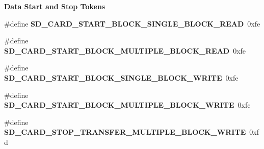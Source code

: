 \begin{Indent}\textbf{ Data Start and Stop Tokens}\par
\begin{DoxyCompactItemize}
\item 
\mbox{\label{spi-sd-card_8c_ab226576a16ca8168a108db3cf12d5122}} 
\#define {\bfseries S\+D\+\_\+\+C\+A\+R\+D\+\_\+\+S\+T\+A\+R\+T\+\_\+\+B\+L\+O\+C\+K\+\_\+\+S\+I\+N\+G\+L\+E\+\_\+\+B\+L\+O\+C\+K\+\_\+\+R\+E\+AD}~0xfe
\item 
\mbox{\label{spi-sd-card_8c_afbf6521b707e3dbce8de0b66d4e6a5ec}} 
\#define {\bfseries S\+D\+\_\+\+C\+A\+R\+D\+\_\+\+S\+T\+A\+R\+T\+\_\+\+B\+L\+O\+C\+K\+\_\+\+M\+U\+L\+T\+I\+P\+L\+E\+\_\+\+B\+L\+O\+C\+K\+\_\+\+R\+E\+AD}~0xfe
\item 
\mbox{\label{spi-sd-card_8c_ad01809d8d257598e3c58e661626df28f}} 
\#define {\bfseries S\+D\+\_\+\+C\+A\+R\+D\+\_\+\+S\+T\+A\+R\+T\+\_\+\+B\+L\+O\+C\+K\+\_\+\+S\+I\+N\+G\+L\+E\+\_\+\+B\+L\+O\+C\+K\+\_\+\+W\+R\+I\+TE}~0xfe
\item 
\mbox{\label{spi-sd-card_8c_ab42bfaae4512dcb79a9c43a50d92471f}} 
\#define {\bfseries S\+D\+\_\+\+C\+A\+R\+D\+\_\+\+S\+T\+A\+R\+T\+\_\+\+B\+L\+O\+C\+K\+\_\+\+M\+U\+L\+T\+I\+P\+L\+E\+\_\+\+B\+L\+O\+C\+K\+\_\+\+W\+R\+I\+TE}~0xfc
\item 
\mbox{\label{spi-sd-card_8c_ae8734848f1dcd34946f5619c37732f80}} 
\#define {\bfseries S\+D\+\_\+\+C\+A\+R\+D\+\_\+\+S\+T\+O\+P\+\_\+\+T\+R\+A\+N\+S\+F\+E\+R\+\_\+\+M\+U\+L\+T\+I\+P\+L\+E\+\_\+\+B\+L\+O\+C\+K\+\_\+\+W\+R\+I\+TE}~0xfd
\end{DoxyCompactItemize}
\end{Indent}
